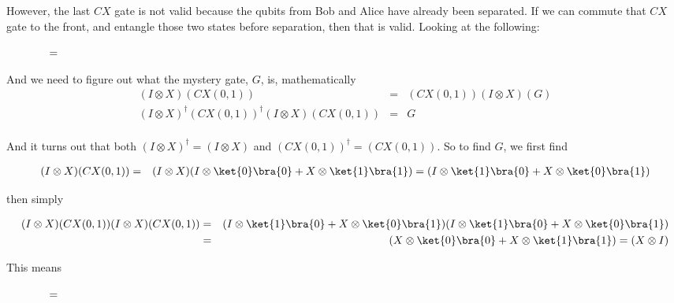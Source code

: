 \documentclass[preprint,aps,prd,nofootinbib,superscriptaddress]{revtex4-2}
\begin{document}
However, the last $CX$ gate is not valid because the qubits from Bob and Alice have already been separated. If we can commute that $CX$ gate to the front, and entangle those two states before separation, then that is valid. Looking at the following:

\begin{figure} [H]
\centering
{} $\text{\quad=}$ 
\end{figure}

And we need to figure out what the mystery gate, $G$, is, mathematically
\begin{eqnarray}
(I \otimes X)(CX(0,1)) &=& (CX(0,1))(I \otimes X)(G)
\nonumber \\
(I \otimes X)^\dagger (CX(0,1))^\dagger (I \otimes X)(CX(0,1)) &=& G
\nonumber \\
\end{eqnarray}

And it turns out that both $(I \otimes X)^\dagger = (I \otimes X)$ and $(CX(0,1))^\dagger = (CX(0,1))$. So to find $G$, we first find

\begin{eqnarray}
(I \otimes X)(CX(0,1)) &=& (I \otimes X)(I \otimes \ket{0}\bra{0} + X \otimes \ket{1}\bra{1}) 
= (I \otimes \ket{1}\bra{0} + X \otimes \ket{0}\bra{1}) \nonumber 
\end{eqnarray}

then simply

\begin{eqnarray}
(I \otimes X)(CX(0,1))(I \otimes X)(CX(0,1)) &=& (I \otimes \ket{1}\bra{0} + X \otimes \ket{0}\bra{1})(I \otimes \ket{1}\bra{0} + X \otimes \ket{0}\bra{1})
\nonumber \\
&=& (X \otimes \ket{0}\bra{0} + X \otimes \ket{1}\bra{1}) = (X \otimes I)
\end{eqnarray}

This means

\begin{figure} [H]
\centering
{} $\text{\quad=}$  
\end{figure}
\end{document}
